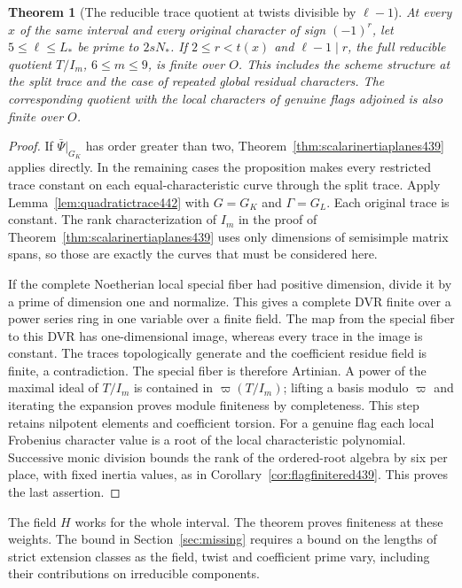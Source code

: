 \documentclass[a4paper,11pt]{article}
\newtheorem{theorem}[proposition]{Theorem}
\theoremstyle{definition}
\theoremstyle{remark}
\numberwithin{equation}{section}
\begin{document}
\begin{theorem}[The reducible trace quotient at twists divisible by \(\ell-1\)]\leavevmode
\label{thm:allzeroweights442}
At every \(x\) of the same interval and every original character
of sign \((-1)^r\), let \(5\le\ell\le L_*\) be prime to \(2sN_*\).
If \(2\le r<t(x)\) and \(\ell-1\mid r\), the full reducible
quotient \(T/I_m\), \(6\le m\le9\), is finite over \(O\).
This includes the scheme structure at the split trace and the
case of repeated global residual characters. The corresponding
quotient with the local characters of genuine flags adjoined is
also finite over \(O\).
\end{theorem}
\begin{proof}
If \(\bar\Psi|_{G_K}\) has order greater than two,
Theorem~\ref{thm:scalarinertiaplanes439} applies directly.
In the remaining cases the proposition makes every restricted
trace constant on each equal-characteristic curve through the
split trace. Apply Lemma~\ref{lem:quadratictrace442} with
\(G=G_K\) and \(\Gamma=G_L\). Each original trace is constant.
The rank characterization of \(I_m\) in the proof of
Theorem~\ref{thm:scalarinertiaplanes439} uses only dimensions
of semisimple matrix spans, so those are exactly the curves
that must be considered here.

If the complete Noetherian local special fiber had positive
dimension, divide it by a prime of dimension one and normalize.
This gives a complete DVR finite over a power series ring in one
variable over a finite field. The map from the special fiber to
this DVR has one-dimensional image, whereas every trace in the
image is constant. The traces topologically generate and the
coefficient residue field is finite, a contradiction. The
special fiber is therefore Artinian. A power of the maximal
ideal of \(T/I_m\) is contained in \(\varpi(T/I_m)\); lifting
a basis modulo \(\varpi\) and iterating the expansion proves
module finiteness by completeness. This step retains nilpotent
elements and coefficient torsion. For a genuine flag each local
Frobenius character value is a root of the local characteristic
polynomial. Successive monic division bounds the rank of the
ordered-root algebra by six per place, with fixed inertia values,
as in Corollary~\ref{cor:flagfinitered439}. This proves the last
assertion.
\end{proof}

The field \(H\) works for the whole interval. The theorem proves
finiteness at these weights. The bound in Section~\ref{sec:missing}
requires a bound on the lengths of strict extension classes as the
field, twist and coefficient prime vary, including their
contributions on irreducible components.
\end{document}
